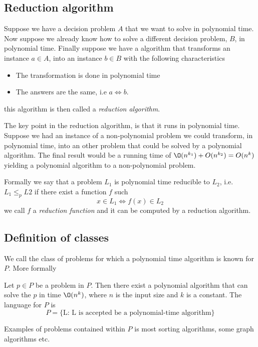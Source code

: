 \documentclass[10pt]{article}
\begin{document}
\subsection{Reduction algorithm} %
\label{sub:reduction_algorithm}
Suppose we have a decision problem $A$ that we want to solve in polynomial time. Now suppose we already know how to solve a different decision problem, $B$, in polynomial time. Finally suppose we have a algorithm that transforms an instance $a \in A$, into an instance $b \in B$ with the following characteristics
\begin{itemize}
  \item The transformation is done in polynomial time
  \item The answers are the same, i.e $a \Leftrightarrow b$.
\end{itemize}
this algorithm is then called a \emph{reduction algorithm}. 

The key point in the reduction algorithm, is that it runs in polynomial time. Suppose we had an instance of a non-polynomial problem we could transform, in polynomial time, into an other problem that could be solved by a polynomial algorithm. The final result would be a running time of $\O(n^{k_1})+O(n^{k_2}) = O(n^k)$ yielding a polynomial algorithm to a non-polynomial problem.

Formally we say that a problem $L_1$ is polynomial time reducible to $L_2$, i.e. $L_1 \leq_p L2$ if there exist a function $f$ such
\begin{equation}
  x \in L_1 \Leftrightarrow f(x) \in L_2 \label{eq15}
\end{equation}
we call $f$ a \emph{reduction function} and it can be computed by a reduction algorithm.



\subsection{Definition of classes} %
\label{sub:definition_of_classes}

We call the class of problems for which a polynomial time algorithm is known for $P$. More formally  
\begin{definition}
Let $p \in P$ be a problem in $P$. Then there exist a polynomial algorithm that can solve the $p$ in time $\O(n^k)$, where $n$ is the input size and $k$ is a constant. The language for $P$ is
\begin{equation}
  P = \{\text{L: L is accepted be a polynomial-time algorithm}\}
\end{equation}
\end{definition}
Examples of problems contained within $P$ is most sorting algorithms, some graph algorithms etc.
\end{document}
